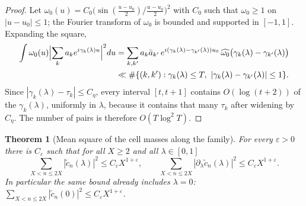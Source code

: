 \documentclass[11pt,reqno]{amsart}
\numberwithin{equation}{section}
\theoremstyle{plain}
\newtheorem{theorem}{Theorem}[section]
\theoremstyle{definition}
\theoremstyle{remark}
\newcommand{\eps}{\varepsilon}
\begin{document}
\begin{proof}
Let $\omega_0(u)=C_0\bigl(\sin(\frac{u-u_0}2)/\frac{u-u_0}2\bigr)^2$ with $C_0$ such that $\omega_0\ge1$ on $|u-u_0|\le1$; the Fourier transform of $\omega_0$ is bounded and supported in $[-1,1]$.  Expanding the square,
\begin{align}
\int \omega_0(u)\Bigl|\sum_ka_ke^{i\gamma_k(\lambda)u}\Bigr|^2du&=\sum_{k,k'}a_k\bar a_{k'}\,e^{i(\gamma_k(\lambda)-\gamma_{k'}(\lambda))u_0}\,\widehat{\omega_0}\bigl(\gamma_k(\lambda)-\gamma_{k'}(\lambda)\bigr)\nonumber\\
&\ll\#\{(k,k'):\gamma_k(\lambda)\le T,\ |\gamma_k(\lambda)-\gamma_{k'}(\lambda)|\le1\}.\label{eq:fejer-pairs}
\end{align}
Since $|\gamma_k(\lambda)-\tau_k|\le C_\eta$, every interval $[t,t+1]$ contains $O(\log(t+2))$ of the $\gamma_k(\lambda)$, uniformly in $\lambda$, because it contains that many $\tau_k$ after widening by $C_\eta$.  The number of pairs is therefore $O(T\log^2T)$.
\end{proof}

\begin{theorem}[Mean square of the cell masses along the family]\label{thm:mean-square-cells}
For every $\eps>0$ there is $C_\eps$ such that for all $X\ge2$ and all $\lambda\in[0,1]$
\begin{equation}\label{eq:mean-square-cells}
 \sum_{X<n\le2X}|\tilde c_n(\lambda)|^2\le C_\eps X^{1+\eps},\qquad
 \sum_{X<n\le2X}|\partial_\lambda\tilde c_n(\lambda)|^2\le C_\eps X^{1+\eps}.
\end{equation}
In particular the same bound already includes $\lambda=0$: $\sum_{X<n\le2X}|\tilde c_n(0)|^2\le C_\eps X^{1+\eps}$.
\end{theorem}
\end{document}
